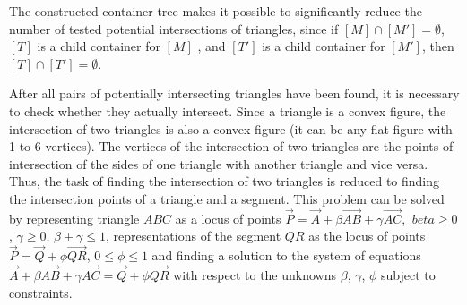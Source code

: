 \documentclass[
11pt,%
tightenlines,%
twoside,%
onecolumn,%
nofloats,%
nobibnotes,%
nofootinbib,%
superscriptaddress,%
noshowpacs,%
centertags]%
{revtex4-2}
\begin{document}
The constructed container tree makes it possible to significantly reduce the number of tested potential intersections of \cite{Jung} triangles, since if $[M] \cap [M'] = \emptyset$, $[T]$ is a child container for $[M]$ , and $[T']$ is a child container for $[M']$, then $[T] \cap [T'] = \emptyset$.

After all pairs of potentially intersecting triangles have been found, it is necessary to check whether they actually intersect.
Since a triangle is a convex figure, the intersection of two triangles is also a convex figure (it can be any flat figure with 1 to 6 vertices).
The vertices of the intersection of two triangles are the points of intersection of the sides of one triangle with another triangle and vice versa.
Thus, the task of finding the intersection of two triangles is reduced to finding the intersection points of a triangle and a segment.
This problem can be solved by representing triangle $ABC$ as a locus of points $\vec{P} = \vec{A} + \beta \vec{AB} + \gamma \vec{AC}$, $\ beta \ge 0$, $\gamma \ge 0$, $\beta + \gamma \le 1$, representations of the segment $QR$ as the locus of points $\vec{P} = \vec{Q} + \phi \vec{QR}$, $0 \le \phi \le 1$ and finding a solution to the system of equations $\vec{A} + \beta \vec{AB} + \gamma \vec{AC} = \vec{Q} + \phi \vec{QR}$ with respect to the unknowns $\beta$, $\gamma$, $\phi$ subject to \cite{Freylekhman} constraints.
\end{document}
